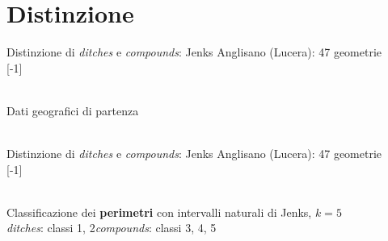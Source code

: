 \documentclass[xcolor=svgnames]{beamer}
\begin{document}
    \section{Distinzione}
        \begin{frame}{Distinzione di \emph{ditches} e \emph{compounds}: Jenks}
            \small{Anglisano (Lucera): 47 geometrie}\\
            \centering
            \scalebox{1}[-1]{ %
                \begin{tikzpicture}[x=1mm,y=1mm,scale=0.15]
                    
                \end{tikzpicture}
            }\\
            \vspace{0.05\textwidth}
            Dati geografici di partenza\\
            ~
        \end{frame}

        \begin{frame}{Distinzione di \emph{ditches} e \emph{compounds}: Jenks}
            \small{Anglisano (Lucera): 47 geometrie}\\
            \centering
            \scalebox{1}[-1]{ %
                \begin{tikzpicture}[x=1mm,y=1mm,scale=0.15]
                    
                \end{tikzpicture}
            }\\
            \vspace{0.05\textwidth}
            Classificazione dei \textbf{perimetri} con intervalli naturali di Jenks, $k=5$\\
            \small{
                \emph{ditches}: classi 1, 2\quad\quad\emph{compounds}: classi 3, 4, 5
            }
        \end{frame}
\end{document}
